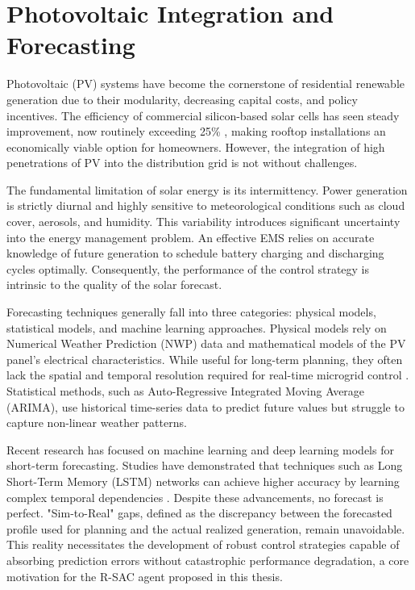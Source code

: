 
\section{Photovoltaic Integration and Forecasting}

Photovoltaic (PV) systems have become the cornerstone of residential renewable generation due to their modularity, decreasing capital costs, and policy incentives. The efficiency of commercial silicon-based solar cells has seen steady improvement, now routinely exceeding 25\% \cite{Green2022}, making rooftop installations an economically viable option for homeowners. However, the integration of high penetrations of PV into the distribution grid is not without challenges.

The fundamental limitation of solar energy is its intermittency. Power generation is strictly diurnal and highly sensitive to meteorological conditions such as cloud cover, aerosols, and humidity. This variability introduces significant uncertainty into the energy management problem. An effective EMS relies on accurate knowledge of future generation to schedule battery charging and discharging cycles optimally. Consequently, the performance of the control strategy is intrinsic to the quality of the solar forecast.

Forecasting techniques generally fall into three categories: physical models, statistical models, and machine learning approaches. Physical models rely on Numerical Weather Prediction (NWP) data and mathematical models of the PV panel's electrical characteristics. While useful for long-term planning, they often lack the spatial and temporal resolution required for real-time microgrid control \cite{Theocharides2023}. Statistical methods, such as Auto-Regressive Integrated Moving Average (ARIMA), use historical time-series data to predict future values but struggle to capture non-linear weather patterns.

Recent research has focused on machine learning and deep learning models for short-term forecasting. Studies have demonstrated that techniques such as Long Short-Term Memory (LSTM) networks can achieve higher accuracy by learning complex temporal dependencies \cite{Deanseekeaw2024}. Despite these advancements, no forecast is perfect. "Sim-to-Real" gaps, defined as the discrepancy between the forecasted profile used for planning and the actual realized generation, remain unavoidable. This reality necessitates the development of robust control strategies capable of absorbing prediction errors without catastrophic performance degradation, a core motivation for the R-SAC agent proposed in this thesis.
